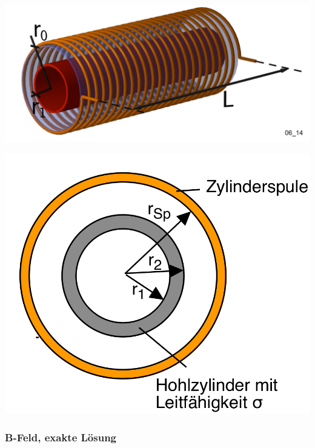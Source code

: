 \begin{minipage}[c][][b]{0.475\textwidth}
    \centering
    \includegraphics[width=.8\textwidth]{images/spule-hohlzylinder.png}
    \label{fig:looser:hohlzylinder3d}
\end{minipage}
\begin{minipage}[c][][b]{0.475\textwidth}
    \centering
    \includegraphics[width=.8\textwidth]{images/spule-hohlzylinder-querschnitt.png}
    \label{fig:looser:hohlzylinder2d}
\end{minipage}


\subsubsection{B-Feld, exakte L\"osung}
\label{sec:arbgru:subsec:hohlzylinder:BExact}

